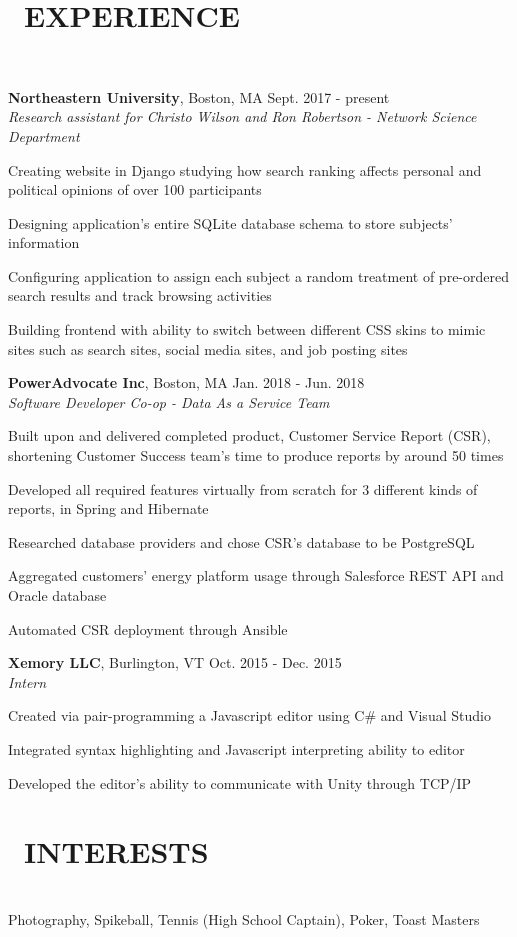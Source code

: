 \documentclass[11pt]{res}
\newcommand{\sectionunderline}{\vspace{-3mm}\hrulefill\\}
\newcommand{\newsect}[1]{\section{\Large \bf #1}}
\begin{document}
\begin{resume}
  \newsect{\faUsers\ EXPERIENCE}{
    \sectionunderline{
      {\bf Northeastern University}, Boston, MA \hfill Sept. 2017 - present\\
      {\it Research assistant for Christo Wilson and Ron Robertson - Network Science Department}
      \begin{itemize}
        {\item Creating website in Django studying how search ranking affects personal and political opinions of over 100 participants}
        {\item Designing application's entire SQLite database schema to store subjects' information}
        {\item Configuring application to assign each subject a random treatment of pre-ordered search results and track browsing activities}
        {\item Building frontend with ability to switch between different CSS skins to mimic sites such as search sites, social media sites, and job posting sites}
      \end{itemize}

      {\bf PowerAdvocate Inc}, Boston, MA \hfill Jan. 2018 - Jun. 2018\\
      {\it Software Developer Co-op - Data As a Service Team}
      \begin{itemize}
        {\item Built upon and delivered completed product, Customer Service Report (CSR), shortening Customer Success team's time to produce reports by around 50 times}
        {\item Developed all required features virtually from scratch for 3 different kinds of reports, in Spring and Hibernate}
        {\item Researched database providers and chose CSR's database to be PostgreSQL}
        {\item Aggregated customers' energy platform usage through Salesforce REST API and Oracle database}
        {\item Automated CSR deployment through Ansible}
      \end{itemize}

      {\bf Xemory LLC}, Burlington, VT \hfill Oct. 2015 - Dec. 2015\\
      {\it Intern}
      \begin{itemize}
        {\item Created via pair-programming a Javascript editor using C\# and Visual Studio}
        {\item Integrated syntax highlighting and Javascript interpreting ability to editor}
        {\item Developed the editor's ability to communicate with Unity through TCP/IP}
      \end{itemize}
    }
  }

  \newsect{\faCamera\ INTERESTS}{
    \sectionunderline{
      Photography, Spikeball, Tennis (High School Captain), Poker, Toast Masters
    }
  }
\end{resume}
\end{document}
